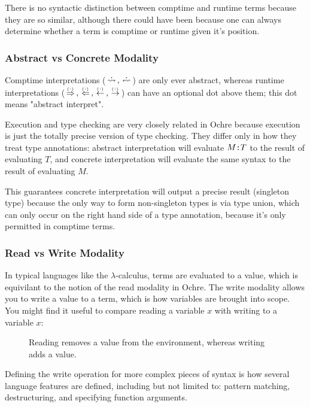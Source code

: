\documentclass[12pt,twoside]{report}
\begin{document}
There is no syntactic distinction between comptime and runtime terms because they are so similar, although there could have been because one can always determine whether a term is comptime or runtime given it's position.

\subsubsection{Abstract vs Concrete Modality}
Comptime interpretations ($\erasedreadarrow, \erasedwritearrow$) are only ever abstract, whereas runtime interpretations ($\movearrow, \writearrow, \narrowarrow, \readarrow$) can have an optional dot above them; this dot means "abstract interpret".

Execution and type checking are very closely related in Ochre because execution is just the totally precise version of type checking. They differ only in how they treat type annotations: abstract interpretation will evaluate $M \mono{:} T$ to the result of evaluating $T$, and concrete interpretation will evaluate the same syntax to the result of evaluating $M$.

This guarantees concrete interpretation will output a precise result (singleton type) because the only way to form non-singleton types is via type union, which can only occur on the right hand side of a type annotation, because it's only permitted in comptime terms.

\subsubsection{Read vs Write Modality}
In typical languages like the $\lambda$-calculus, terms are evaluated to a value, which is equivilant to the notion of the read modality in Ochre. The write modality allows you to write a value to a term, which is how variables are brought into scope. You might find it useful to compare reading a variable $x$ with writing to a variable $x$:

\begin{figure}[H]
  \begin{mathpar}

  \end{mathpar}
  \caption{Reading removes a value from the environment, whereas writing adds a value.}
\end{figure}
\vspace{-5ex}
\noindent
Defining the write operation for more complex pieces of syntax is how several language features are defined, including but not limited to: pattern matching, destructuring, and specifying function arguments.
\end{document}

